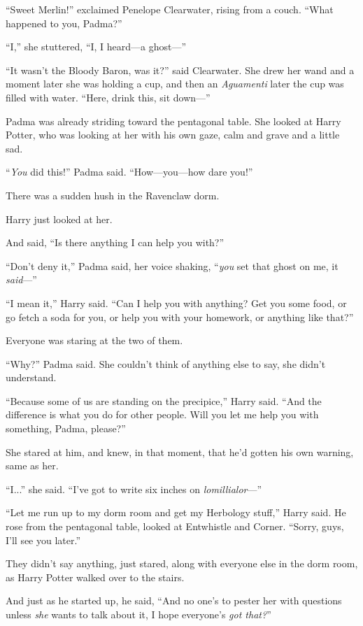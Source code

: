 “Sweet Merlin!” exclaimed Penelope Clearwater, rising from a couch. “What happened to you, Padma?”

“I,” she stuttered, “I, I heard—a ghost—”

“It wasn’t the Bloody Baron, was it?” said Clearwater. She drew her wand and a moment later she was holding a cup, and then an \emph{Aguamenti} later the cup was filled with water. “Here, drink this, sit down—”

Padma was already striding toward the pentagonal table. She looked at Harry Potter, who was looking at her with his own gaze, calm and grave and a little sad.

“\emph{You} did this!” Padma said. “How—you—how dare you!”

There was a sudden hush in the Ravenclaw dorm.

Harry just looked at her.

And said, “Is there anything I can help you with?”

“Don’t deny it,” Padma said, her voice shaking, “\emph{you} set that ghost on me, it \emph{said}—”

“I mean it,” Harry said. “Can I help you with anything? Get you some food, or go fetch a soda for you, or help you with your homework, or anything like that?”

Everyone was staring at the two of them.

“Why?” Padma said. She couldn’t think of anything else to say, she didn’t understand.

“Because some of us are standing on the precipice,” Harry said. “And the difference is what you do for other people. Will you let me help you with something, Padma, please?”

She stared at him, and knew, in that moment, that he’d gotten his own warning, same as her.

“I...” she said. “I’ve got to write six inches on \emph{lomillialor}—”

“Let me run up to my dorm room and get my Herbology stuff,” Harry said. He rose from the pentagonal table, looked at Entwhistle and Corner. “Sorry, guys, I’ll see you later.”

They didn’t say anything, just stared, along with everyone else in the dorm room, as Harry Potter walked over to the stairs.

And just as he started up, he said, “And no one’s to pester her with questions unless \emph{she} wants to talk about it, I hope everyone’s \emph{got that?}”

